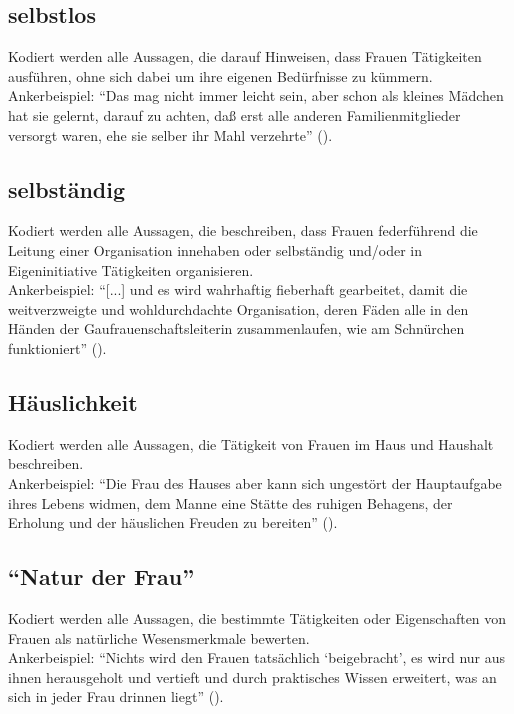 \documentclass[12pt, titlepage=true, toc=bib]{scrartcl}
\begin{document}
{\subsection*{selbstlos}

Kodiert werden alle Aussagen, die darauf Hinweisen, dass Frauen Tätigkeiten ausführen, ohne sich dabei um ihre eigenen Bedürfnisse zu kümmern.\\
Ankerbeispiel: "`Das mag nicht immer leicht sein, aber schon als kleines Mädchen hat sie gelernt, darauf zu achten, daß erst alle anderen Familienmitglieder versorgt waren, ehe sie selber ihr Mahl verzehrte"' (\cite[5]{friewart_japanisches_1941}).

\subsection*{selbständig}

Kodiert werden alle Aussagen, die beschreiben, dass Frauen federführend die Leitung einer Organisation innehaben oder selbständig und/oder in Eigeninitiative Tätigkeiten organisieren.\\
Ankerbeispiel: "`[...] und es wird wahrhaftig fieberhaft gearbeitet, damit die weitverzweigte und wohldurchdachte Organisation, deren Fäden alle in den Händen der Gaufrauenschaftsleiterin zusammenlaufen, wie am Schnürchen funktioniert"' (\cite[778]{a._v._s._kameradschaft_1936}).

\subsection*{Häuslichkeit}

Kodiert werden alle Aussagen, die Tätigkeit von Frauen im Haus und Haushalt beschreiben.\\
Ankerbeispiel: "`Die Frau des Hauses aber kann sich ungestört der Hauptaufgabe ihres Lebens widmen, dem Manne eine Stätte des ruhigen Behagens, der Erholung und der häuslichen Freuden zu bereiten"' (\cite[5]{friewart_japanisches_1941}).

\subsection*{"`Natur der Frau"'}

Kodiert werden alle Aussagen, die bestimmte Tätigkeiten oder Eigenschaften von Frauen als natürliche Wesensmerkmale bewerten.\\
Ankerbeispiel: \enquote{Nichts wird den Frauen tatsächlich \enquote{beigebracht}, es wird nur aus ihnen herausgeholt und vertieft und durch praktisches Wissen erweitert, was an sich in jeder Frau drinnen liegt} (\cite[775]{a._v._s._kameradschaft_1936}).

}
\end{document}
